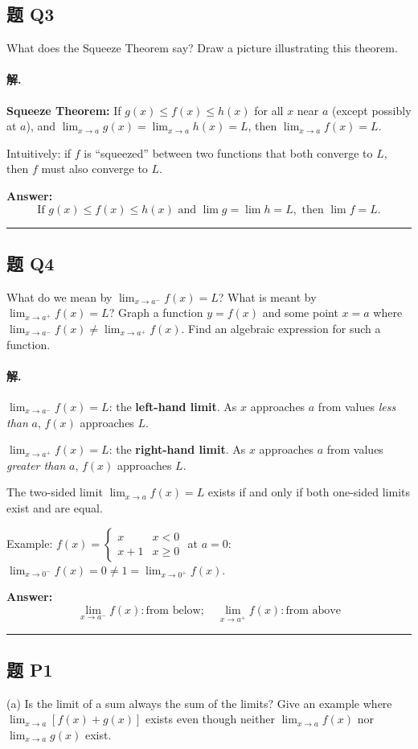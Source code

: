 \documentclass[12pt, a4paper]{article}
\newcommand{\problem}[1]{\subsection*{题 #1}}
\newcommand{\solution}{\paragraph{解.}}
\begin{document}
\problem{Q3}

What does the Squeeze Theorem say? Draw a picture illustrating this theorem.

\solution

\textbf{Squeeze Theorem:} If $g(x) \le f(x) \le h(x)$ for all $x$ near $a$ (except possibly at $a$), and $\lim_{x \to a} g(x) = \lim_{x \to a} h(x) = L$, then $\lim_{x \to a} f(x) = L$.

Intuitively: if $f$ is ``squeezed'' between two functions that both converge to $L$, then $f$ must also converge to $L$.

\textbf{Answer:}
\[\boxed{\text{If } g(x) \le f(x) \le h(x) \text{ and } \lim g = \lim h = L, \text{ then } \lim f = L.}\]

\vspace{1em}
\hrule
\vspace{1em}

\problem{Q4}

What do we mean by $\lim_{x \to a^-} f(x) = L$? What is meant by $\lim_{x \to a^+} f(x) = L$? Graph a function $y = f(x)$ and some point $x = a$ where $\lim_{x \to a^-} f(x) \neq \lim_{x \to a^+} f(x)$. Find an algebraic expression for such a function.

\solution

$\lim_{x \to a^-} f(x) = L$: the \textbf{left-hand limit}. As $x$ approaches $a$ from values \emph{less than} $a$, $f(x)$ approaches $L$.

$\lim_{x \to a^+} f(x) = L$: the \textbf{right-hand limit}. As $x$ approaches $a$ from values \emph{greater than} $a$, $f(x)$ approaches $L$.

The two-sided limit $\lim_{x \to a} f(x) = L$ exists if and only if both one-sided limits exist and are equal.

Example: $f(x) = \begin{cases} x & x < 0 \\ x+1 & x \ge 0 \end{cases}$ at $a = 0$: $\lim_{x \to 0^-} f(x) = 0 \neq 1 = \lim_{x \to 0^+} f(x)$.

\textbf{Answer:}
\[\boxed{\lim_{x \to a^-} f(x): \text{from below}; \quad \lim_{x \to a^+} f(x): \text{from above}}\]

\vspace{1em}
\hrule
\vspace{1em}

\problem{P1}

(a) Is the limit of a sum always the sum of the limits? Give an example where $\lim_{x \to a}[f(x) + g(x)]$ exists even though neither $\lim_{x \to a} f(x)$ nor $\lim_{x \to a} g(x)$ exist.
\end{document}
